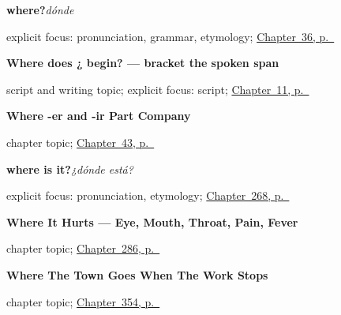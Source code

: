 \noindent\begin{minipage}[t]{\linewidth}
\raggedright
\textbf{where?}\enspace\emph{dónde}\par
\footnotesize explicit focus: pronunciation, grammar, etymology; \hyperref[ch:spanish-beber-preguntas]{Chapter~36, p.~\pageref*{ch:spanish-beber-preguntas}}
\end{minipage}\par\smallskip

\noindent\begin{minipage}[t]{\linewidth}
\raggedright
\textbf{Where does ¿ begin? — bracket the spoken span}\par
\footnotesize script and writing topic; explicit focus: script; \hyperref[ch:enye-and-marks]{Chapter~11, p.~\pageref*{ch:enye-and-marks}}
\end{minipage}\par\smallskip

\noindent\begin{minipage}[t]{\linewidth}
\raggedright
\textbf{Where -er and -ir Part Company}\par
\footnotesize chapter topic; \hyperref[ch:spanish-er-ir-1pl]{Chapter~43, p.~\pageref*{ch:spanish-er-ir-1pl}}
\end{minipage}\par\smallskip

\noindent\begin{minipage}[t]{\linewidth}
\raggedright
\textbf{where is it?}\enspace\emph{¿dónde está?}\par
\footnotesize explicit focus: pronunciation, etymology; \hyperref[ch:viajar]{Chapter~268, p.~\pageref*{ch:viajar}}
\end{minipage}\par\smallskip

\noindent\begin{minipage}[t]{\linewidth}
\raggedright
\textbf{Where It Hurts --- Eye, Mouth, Throat, Pain, Fever}\par
\footnotesize chapter topic; \hyperref[ch:donde-duele]{Chapter~286, p.~\pageref*{ch:donde-duele}}
\end{minipage}\par\smallskip

\noindent\begin{minipage}[t]{\linewidth}
\raggedright
\textbf{Where The Town Goes When The Work Stops}\par
\footnotesize chapter topic; \hyperref[ch:el-hotel-y-el-cine]{Chapter~354, p.~\pageref*{ch:el-hotel-y-el-cine}}
\end{minipage}\par\smallskip

